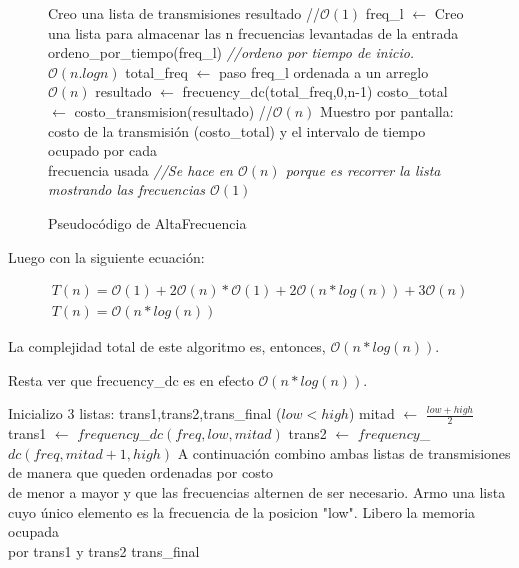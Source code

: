 \begin{figure}[!ht]
\begin{codebox}
\li Creo una lista de transmisiones resultado  //$\mathcal{O}(1)$ 
\li freq_l $\leftarrow$ Creo una lista para almacenar las n frecuencias levantadas de la entrada
\li ordeno_por_tiempo(freq_l) {\it //ordeno por tiempo de inicio. $\mathcal{O}(n.logn)$}
\li total_freq $\leftarrow$ paso freq_l ordenada a un arreglo $\mathcal{O}(n)$
\li resultado $\leftarrow$ frecuency_dc(total_freq,0,n-1)
\li costo_total $\leftarrow$ costo_transmision(resultado) //$\mathcal{O}(n)$
\li Muestro por pantalla: costo de la transmisión (costo_total) y el intervalo de tiempo ocupado por cada\\ frecuencia usada {\it //Se hace en $\mathcal{O}(n)$ porque es recorrer la lista mostrando las frecuencias $\mathcal{O}(1)$}
\end{codebox}
\caption{Pseudocódigo de AltaFrecuencia}\label{code:goloso}
\end{figure}
\FloatBarrier

Luego con la siguiente ecuación:

\begin{equation*}
\begin{array}{l}
T(n) = \mathcal{O}(1) + 2\mathcal{O}(n)*\mathcal{O}(1) + 2\mathcal{O}(n*log(n)) + 3\mathcal{O}(n)\\
T(n) = \mathcal{O}(n*log(n))
\end{array}
\end{equation*}

La complejidad total de este algoritmo es, entonces, $\mathcal{O}(n*log(n))$.

Resta ver que frecuency_dc es en efecto $\mathcal{O}(n*log(n))$.

\begin{codebox}
\li Inicializo 3 listas: trans1,trans2,trans_final
\li \If ($low<high$)
\li	\quad	mitad $\longleftarrow$ $\frac{low + high}{2}$
\li	\quad	trans1 $\longleftarrow$ $frequency$_$dc(freq,low,mitad)$
\li	\quad	trans2 $\longleftarrow$ $frequency$_$dc(freq,mitad+1,high)$
\li	\quad	A continuación combino ambas listas de transmisiones de manera que queden ordenadas por costo
\\ \quad de menor a mayor y que las frecuencias alternen de ser necesario.
\li \Else
\li \quad	Armo una lista cuyo único elemento es la frecuencia de la posicion "low". Libero la memoria ocupada\\ \quad por trans1 y trans2
\li \Return trans_final 
 \end{codebox}



